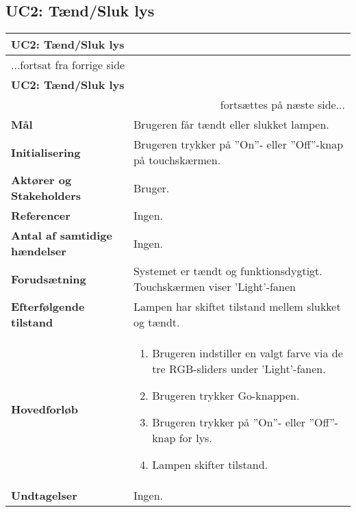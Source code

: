 \subsection{UC2: Tænd/Sluk lys}

\begin{center} \centering
	\begin{longtable}{|p{6cm}|p{8cm}|}
	\hline
		\multicolumn{2}{|l|}{\textbf{UC2: Tænd/Sluk lys}} \\\hline
		\endfirsthead
		
		\multicolumn{2}{l}{...fortsat fra forrige side} \\ \hline 
		\multicolumn{2}{|l|}{\textbf{UC2: Tænd/Sluk lys}} \\\hline
		\endhead		

        \multicolumn{2}{r}{fortsættes på næste side...} \\
        \endfoot
        \endlastfoot
        
        \textbf{Mål}								
            & Brugeren får tændt eller slukket lampen.
        \\ \hline
        \textbf{Initialisering}					
            & Brugeren trykker på ”On”- eller ”Off”-knap på touchskærmen.
        \\ \hline
        \textbf{Aktører og Stakeholders}			
            & Bruger.
        \\ \hline
        \textbf{Referencer}						
            & Ingen.
        \\ \hline
        \textbf{Antal af samtidige hændelser}	
            & Ingen.
        \\ \hline
        \textbf{Forudsætning}					
            & Systemet er tændt og funktionsdygtigt. Touchskærmen viser 'Light'-fanen
        \\ \hline
        \textbf{Efterfølgende tilstand}			
            & Lampen har skiftet tilstand mellem slukket og tændt.
        \\ \hline
        \textbf{Hovedforløb}						
            & 
            \begin{enumerate}
                \item Brugeren indstiller en valgt farve via de tre RGB-sliders under 'Light'-fanen.
                \item Brugeren trykker Go-knappen.
                \item Brugeren trykker på ”On”- eller ”Off”-knap for lys.
                \item Lampen skifter tilstand.
            \end{enumerate}
        \\ \hline
        \textbf{Undtagelser}						
            & Ingen.
        \\ \hline
	\end{longtable}
	\label{UC2} 
\end{center}